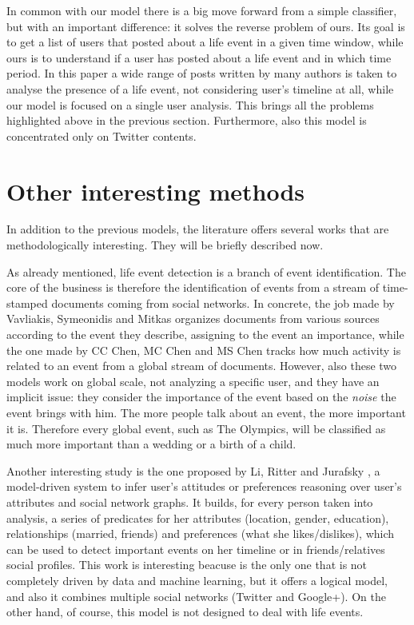 In common with our model there is a big move forward from a simple classifier, but with an important difference: it solves the reverse problem of ours. Its goal is to get a list of users that posted about a life event in a given time window, while ours is to understand if a user has posted about a life event and in which time period. In this paper a wide range of posts written by many authors is taken to analyse the presence of a life event, not considering user's timeline at all, while our model is focused on a single user analysis. This brings all the problems highlighted above in the previous section. Furthermore, also this model is  concentrated only on Twitter contents.

\section{Other interesting methods}
In addition to the previous models, the literature offers several works that are methodologically interesting. They will be briefly described now.

As already mentioned, life event detection is a branch of event identification. The core of the business is therefore the identification of events from a stream of time-stamped documents coming from social networks. In concrete, the job made by Vavliakis, Symeonidis and Mitkas \cite{vavliakis2013event} organizes documents from various sources according to the event they describe, assigning to the event an importance, while the one made by CC Chen, MC Chen and MS Chen \cite{chen2009adaptive} tracks how much activity is related to an event from a global stream of documents. However, also these two models work on global scale, not analyzing a specific user, and they have an implicit issue: they consider the importance of the event based on the \textit{noise} the event brings with him. The more people talk about an event, the more important it is. Therefore every global event, such as The Olympics, will be classified as much more important than a wedding or a birth of a child.

Another interesting study is the one proposed by Li, Ritter and Jurafsky \cite{li2014inferring}, a model-driven system to infer user's attitudes or preferences reasoning over user's attributes and social network graphs. It builds, for every person taken into analysis, a series of predicates for her attributes (location, gender, education), relationships (married, friends) and preferences (what she likes/dislikes), which can be used to detect important events on her timeline or in friends/relatives social profiles. This work is interesting beacuse is the only one that is not completely driven by data and machine learning, but it offers a logical model, and also it combines multiple social networks (Twitter and Google+). On the other hand, of course, this model is not designed to deal with life events.

